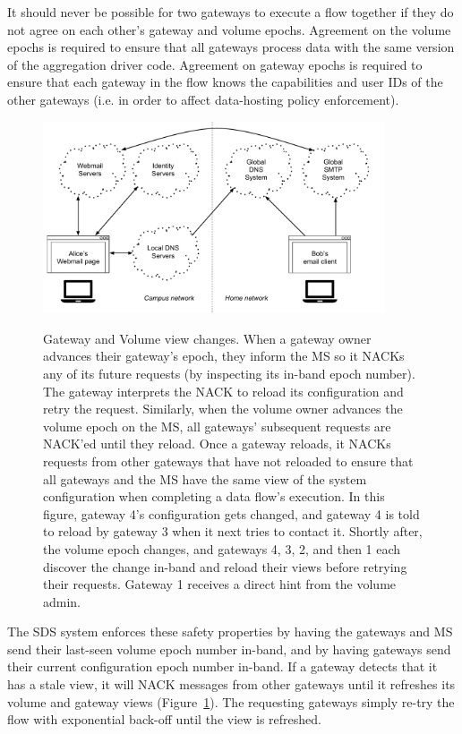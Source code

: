 It should never be possible for two gateways to execute a flow together if they
do not agree on each other's gateway and volume epochs.  Agreement on the volume
epochs is required to ensure that all gateways process data with the same version
of the aggregation driver code.  Agreement on gateway epochs is required to
ensure that each gateway in the flow knows the capabilities and user IDs of the
other gateways (i.e. in order to affect data-hosting policy enforcement).

\begin{figure}[h!]
   \caption{Gateway and Volume view changes.  When a gateway owner advances
   their gateway's epoch, they inform the MS so it NACKs any of its future
   requests (by inspecting its in-band epoch number).  The gateway interprets
   the NACK to reload its configuration and retry the request.  Similarly, when
   the volume owner advances the volume epoch on the MS, all gateways'
   subsequent requests are NACK'ed until they reload.  Once a gateway reloads,
   it NACKs requests from other gateways that have not reloaded to ensure that
   all gateways and the MS have the same view of the system configuration
   when completing a data flow's execution.  In this figure, gateway 4's
   configuration gets changed, and gateway 4 is told to reload by gateway 3 when it
   next tries to contact it.  Shortly after, the volume epoch changes, and
   gateways 4, 3, 2, and then 1 each discover the change in-band and reload
   their views before retrying their requests.  Gateway 1 receives a direct hint
   from the volume admin.}
   \centering
   \includegraphics[width=0.9\textwidth,page=12]{figures/dissertation-figures}
   \label{fig:chap2-view-changes}
\end{figure}

The SDS system enforces these safety properties by having the gateways and MS
send their last-seen volume epoch number in-band, and by having gateways send their
current configuration epoch number in-band.  If a gateway detects that it has a stale
view, it will NACK messages from other gateways until it refreshes its volume
and gateway views (Figure~\ref{fig:chap2-view-changes}).
The requesting gateways simply re-try the flow with
exponential back-off until the view is refreshed.

